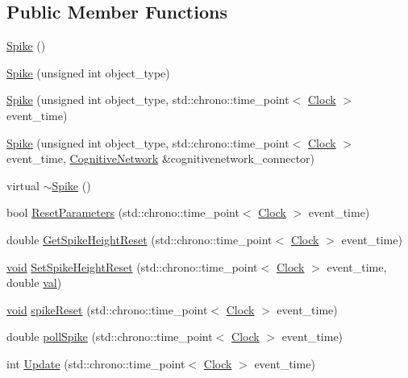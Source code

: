 \subsection*{Public Member Functions}
\begin{DoxyCompactItemize}
\item 
\mbox{\hyperlink{class_spike_a1f82ea9e43a3a71b878261753c722dd9}{Spike}} ()
\item 
\mbox{\hyperlink{class_spike_a3e6dbba4e235f7adb02ade45c918b266}{Spike}} (unsigned int object\+\_\+type)
\item 
\mbox{\hyperlink{class_spike_a9368fb7b20887e5f02f3de6176f04c02}{Spike}} (unsigned int object\+\_\+type, std\+::chrono\+::time\+\_\+point$<$ \mbox{\hyperlink{universe_8h_a0ef8d951d1ca5ab3cfaf7ab4c7a6fd80}{Clock}} $>$ event\+\_\+time)
\item 
\mbox{\hyperlink{class_spike_afecf811f48103b529016a73349b50fe4}{Spike}} (unsigned int object\+\_\+type, std\+::chrono\+::time\+\_\+point$<$ \mbox{\hyperlink{universe_8h_a0ef8d951d1ca5ab3cfaf7ab4c7a6fd80}{Clock}} $>$ event\+\_\+time, \mbox{\hyperlink{class_cognitive_network}{Cognitive\+Network}} \&cognitivenetwork\+\_\+connector)
\item 
virtual \mbox{\hyperlink{class_spike_a6c2c62e81cb32ca4eb73bc686974d00d}{$\sim$\+Spike}} ()
\item 
bool \mbox{\hyperlink{class_spike_af4475560da7a33e70a0f2036197f000f}{Reset\+Parameters}} (std\+::chrono\+::time\+\_\+point$<$ \mbox{\hyperlink{universe_8h_a0ef8d951d1ca5ab3cfaf7ab4c7a6fd80}{Clock}} $>$ event\+\_\+time)
\item 
double \mbox{\hyperlink{class_spike_a6266871881a2581aaee499f6a10e1841}{Get\+Spike\+Height\+Reset}} (std\+::chrono\+::time\+\_\+point$<$ \mbox{\hyperlink{universe_8h_a0ef8d951d1ca5ab3cfaf7ab4c7a6fd80}{Clock}} $>$ event\+\_\+time)
\item 
\mbox{\hyperlink{glad_8h_a950fc91edb4504f62f1c577bf4727c29}{void}} \mbox{\hyperlink{class_spike_a872adf39d66b0f491fb179c9745d7d11}{Set\+Spike\+Height\+Reset}} (std\+::chrono\+::time\+\_\+point$<$ \mbox{\hyperlink{universe_8h_a0ef8d951d1ca5ab3cfaf7ab4c7a6fd80}{Clock}} $>$ event\+\_\+time, double \mbox{\hyperlink{glad_8h_a26942fd2ed566ef553eae82d2c109c8f}{val}})
\item 
\mbox{\hyperlink{glad_8h_a950fc91edb4504f62f1c577bf4727c29}{void}} \mbox{\hyperlink{class_spike_acce1cc96e84e7cbf3b68010ab32f045e}{spike\+Reset}} (std\+::chrono\+::time\+\_\+point$<$ \mbox{\hyperlink{universe_8h_a0ef8d951d1ca5ab3cfaf7ab4c7a6fd80}{Clock}} $>$ event\+\_\+time)
\item 
double \mbox{\hyperlink{class_spike_ac465dbe6500f1eb1f5421f7174f91dd3}{poll\+Spike}} (std\+::chrono\+::time\+\_\+point$<$ \mbox{\hyperlink{universe_8h_a0ef8d951d1ca5ab3cfaf7ab4c7a6fd80}{Clock}} $>$ event\+\_\+time)
\item 
int \mbox{\hyperlink{class_spike_a683a0ca5e62e68777381fc85f4bf3019}{Update}} (std\+::chrono\+::time\+\_\+point$<$ \mbox{\hyperlink{universe_8h_a0ef8d951d1ca5ab3cfaf7ab4c7a6fd80}{Clock}} $>$ event\+\_\+time)
\end{DoxyCompactItemize}
